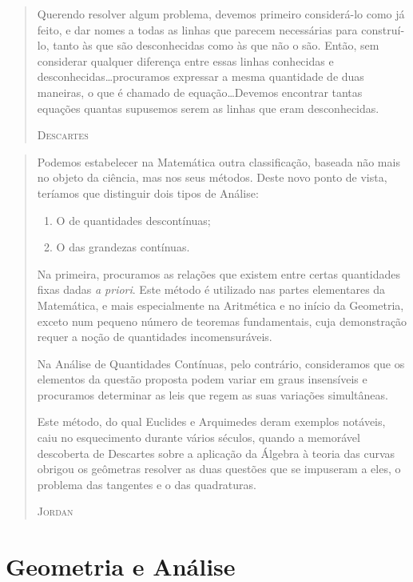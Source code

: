 \documentclass{hipatia}
\begin{document}
\begin{quote}
    Querendo resolver algum problema, devemos primeiro considerá-lo como já feito, e dar nomes a todas as linhas que parecem necessárias para construí-lo, tanto às que são desconhecidas como às que não o são. Então, sem considerar qualquer diferença entre essas linhas conhecidas e desconhecidas\dots  procuramos expressar a mesma quantidade de duas maneiras, o que é chamado de equação\dots  Devemos encontrar tantas equações quantas supusemos serem as linhas que eram desconhecidas.

\hfill \textsc{Descartes}
\end{quote} 


\begin{quote}
Podemos estabelecer na Matemática outra classificação, baseada não mais no objeto da ciência, mas nos seus métodos. Deste novo ponto de vista, teríamos que distinguir dois tipos de Análise:

\begin{enumerate}
\item O de quantidades descontínuas;
\item O das grandezas contínuas.
\end{enumerate}

Na primeira, procuramos as relações que existem entre certas quantidades fixas dadas \emph{a priori}. Este método é utilizado nas partes elementares da Matemática, e mais especialmente na Aritmética e no início da Geometria, exceto num pequeno número de teoremas fundamentais, cuja demonstração requer a noção de quantidades incomensuráveis.

Na Análise de Quantidades Contínuas, pelo contrário, consideramos que os elementos da questão proposta podem variar em graus insensíveis e procuramos determinar as leis que regem as suas variações simultâneas.

Este método, do qual Euclides e Arquimedes deram exemplos notáveis, caiu no esquecimento durante vários séculos, quando a memorável descoberta de Descartes sobre a aplicação da Álgebra à teoria das curvas obrigou os geômetras resolver as duas questões que se impuseram a eles, o problema das tangentes e o das quadraturas.

\hfill \textsc{Jordan}
\end{quote}

\section{Geometria e Análise}
\end{document}
